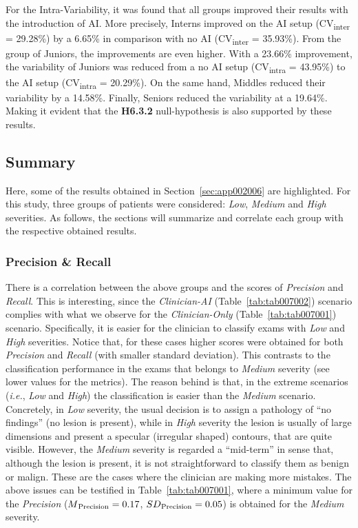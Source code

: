 For the Intra-Variability, it was found that all groups improved their results with the introduction of \ac{AI}.
More precisely, Interns improved on the \ac{AI} setup (CV\textsubscript{inter} = 29.28\%) by a 6.65\% in comparison with no \ac{AI} (CV\textsubscript{inter} = 35.93\%).
From the group of Juniors, the improvements are even higher.
With a 23.66\% improvement, the variability of Juniors was reduced from a no \ac{AI} setup (CV\textsubscript{intra} = 43.95\%) to the \ac{AI} setup (CV\textsubscript{intra} = 20.29\%).
On the same hand, Middles reduced their variability by a 14.58\%.
Finally, Seniors reduced the variability at a 19.64\%.
Making it evident that the {\bf H6.3.2} null-hypothesis is also supported by these results.

\subsection{Summary}
\label{sec:app002006004}

Here, some of the results obtained in Section~\ref{sec:app002006} are highlighted.
For this study, three groups of patients were considered: {\it Low}, {\it Medium} and {\it High} severities.
As follows, the sections will summarize and correlate each group with the respective obtained results.

\subsubsection{Precision \& Recall}
\label{sec:app002006004001}

There is a correlation between the above groups and the scores of {\it Precision} and {\it Recall}.
This is interesting, since the {\it Clinician-AI} (Table~\ref{tab:tab007002}) scenario complies with what we observe for the {\it Clinician-Only} (Table~\ref{tab:tab007001}) scenario.
Specifically, it is easier for the clinician to classify exams with {\it Low} and {\it High} severities. Notice that, for these cases higher scores were obtained for both {\it Precision} and {\it Recall} (with smaller standard deviation).
This contrasts to the classification performance in the exams that belongs to {\it Medium} severity (see lower values for the metrics).
The reason behind is that, in the  extreme scenarios ({\it i.e.}, {\it Low} and {\it High}) the classification is easier than the {\it Medium} scenario.
Concretely, in {\it Low} severity, the usual decision is to assign a pathology of ``no findings'' (no lesion is present), while in {\it High} severity the lesion is usually of large dimensions and present a specular (irregular shaped) contours, that are quite visible.
However, the {\it Medium} severity is regarded a ``mid-term'' in sense that, although the lesion is present, it is not straightforward to classify them as benign or malign.
These are the cases where the clinician are making more mistakes.
The above issues can be testified in Table~\ref{tab:tab007001}, where a minimum value for the {\it Precision} ($M\textsubscript{Precision} = 0.17$, $SD\textsubscript{Precision} = 0.05$) is obtained for the {\it Medium} severity.

